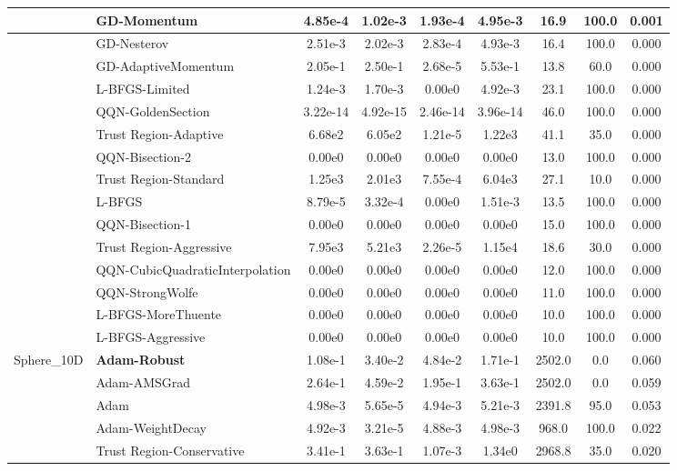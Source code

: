 \documentclass{article}
\begin{document}
\begin{longtable}{|l|l|c|c|c|c|c|c|c|}
\hline
 & GD-Momentum & 4.85e-4 & 1.02e-3 & 1.93e-4 & 4.95e-3 & 16.9 & 100.0 & 0.001 \\
\hline
 & GD-Nesterov & 2.51e-3 & 2.02e-3 & 2.83e-4 & 4.93e-3 & 16.4 & 100.0 & 0.000 \\
\hline
 & GD-AdaptiveMomentum & 2.05e-1 & 2.50e-1 & 2.68e-5 & 5.53e-1 & 13.8 & 60.0 & 0.000 \\
\hline
 & L-BFGS-Limited & 1.24e-3 & 1.70e-3 & 0.00e0 & 4.92e-3 & 23.1 & 100.0 & 0.000 \\
\hline
 & QQN-GoldenSection & 3.22e-14 & 4.92e-15 & 2.46e-14 & 3.96e-14 & 46.0 & 100.0 & 0.000 \\
\hline
 & Trust Region-Adaptive & 6.68e2 & 6.05e2 & 1.21e-5 & 1.22e3 & 41.1 & 35.0 & 0.000 \\
\hline
 & QQN-Bisection-2 & 0.00e0 & 0.00e0 & 0.00e0 & 0.00e0 & 13.0 & 100.0 & 0.000 \\
\hline
 & Trust Region-Standard & 1.25e3 & 2.01e3 & 7.55e-4 & 6.04e3 & 27.1 & 10.0 & 0.000 \\
\hline
 & L-BFGS & 8.79e-5 & 3.32e-4 & 0.00e0 & 1.51e-3 & 13.5 & 100.0 & 0.000 \\
\hline
 & QQN-Bisection-1 & 0.00e0 & 0.00e0 & 0.00e0 & 0.00e0 & 15.0 & 100.0 & 0.000 \\
\hline
 & Trust Region-Aggressive & 7.95e3 & 5.21e3 & 2.26e-5 & 1.15e4 & 18.6 & 30.0 & 0.000 \\
\hline
 & QQN-CubicQuadraticInterpolation & 0.00e0 & 0.00e0 & 0.00e0 & 0.00e0 & 12.0 & 100.0 & 0.000 \\
\hline
 & QQN-StrongWolfe & 0.00e0 & 0.00e0 & 0.00e0 & 0.00e0 & 11.0 & 100.0 & 0.000 \\
\hline
 & L-BFGS-MoreThuente & 0.00e0 & 0.00e0 & 0.00e0 & 0.00e0 & 10.0 & 100.0 & 0.000 \\
\hline
 & L-BFGS-Aggressive & 0.00e0 & 0.00e0 & 0.00e0 & 0.00e0 & 10.0 & 100.0 & 0.000 \\
Sphere\_10D & \textbf{Adam-Robust} & 1.08e-1 & 3.40e-2 & 4.84e-2 & 1.71e-1 & 2502.0 & 0.0 & 0.060 \\
\hline
 & Adam-AMSGrad & 2.64e-1 & 4.59e-2 & 1.95e-1 & 3.63e-1 & 2502.0 & 0.0 & 0.059 \\
\hline
 & Adam & 4.98e-3 & 5.65e-5 & 4.94e-3 & 5.21e-3 & 2391.8 & 95.0 & 0.053 \\
\hline
 & Adam-WeightDecay & 4.92e-3 & 3.21e-5 & 4.88e-3 & 4.98e-3 & 968.0 & 100.0 & 0.022 \\
\hline
 & Trust Region-Conservative & 3.41e-1 & 3.63e-1 & 1.07e-3 & 1.34e0 & 2968.8 & 35.0 & 0.020 \\

\end{longtable}
\end{document}
